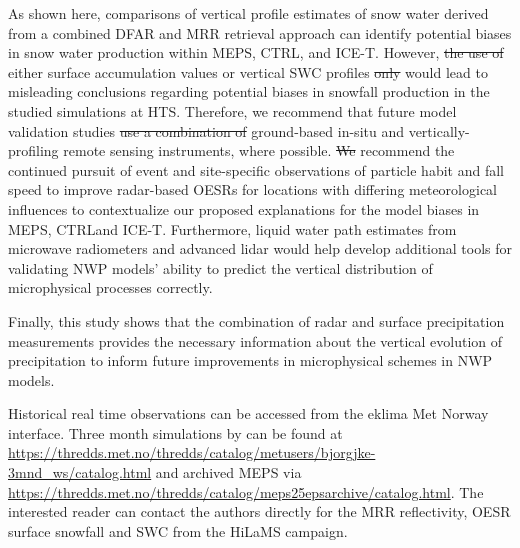 \documentclass{ametsocV5}
\providecommand{\DIFadd}[1]{{\protect\color{blue}\uwave{#1}}} %
\providecommand{\DIFdel}[1]{{\protect\color{red}\sout{#1}}}                      %
\providecommand{\DIFaddbegin}{} %
\providecommand{\DIFaddend}{} %
\providecommand{\DIFdelbegin}{} %
\providecommand{\DIFdelend}{} %
\newcommand{\DIFscaledelfig}{0.5}
\newlength{\DIFdelgraphicswidth} %
\newlength{\DIFdelgraphicsheight} %
\newcommand{\DIFaddincludegraphics}[2][]{{\color{blue}\fbox{\DIFOincludegraphics[#1]{#2}}}} %
\newcommand{\DIFdelincludegraphics}[2][]{%
\sbox{\DIFdelgraphicsbox}{\DIFOincludegraphics[#1]{#2}}%
\settoboxwidth{\DIFdelgraphicswidth}{\DIFdelgraphicsbox} %
\settoboxtotalheight{\DIFdelgraphicsheight}{\DIFdelgraphicsbox} %
\scalebox{\DIFscaledelfig}{%
\parbox[b]{\DIFdelgraphicswidth}{\usebox{\DIFdelgraphicsbox}\\[-\baselineskip] \rule{\DIFdelgraphicswidth}{0em}}\llap{\resizebox{\DIFdelgraphicswidth}{\DIFdelgraphicsheight}{%
\setlength{\unitlength}{\DIFdelgraphicswidth}%
\begin{picture}(1,1)%
\thicklines\linethickness{2pt} %
{\color[rgb]{1,0,0}\put(0,0){\framebox(1,1){}}}%
{\color[rgb]{1,0,0}\put(0,0){\line( 1,1){1}}}%
{\color[rgb]{1,0,0}\put(0,1){\line(1,-1){1}}}%
\end{picture}%
}\hspace*{3pt}}} %
} %
\DeclareRobustCommand{\DIFaddbegin}{\DIFOaddbegin \let\includegraphics\DIFaddincludegraphics} %
\DeclareRobustCommand{\DIFaddend}{\DIFOaddend \let\includegraphics\DIFOincludegraphics} %
\DeclareRobustCommand{\DIFdelbegin}{\DIFOdelbegin \let\includegraphics\DIFdelincludegraphics} %
\DeclareRobustCommand{\DIFdelend}{\DIFOaddend \let\includegraphics\DIFOincludegraphics} %
\begin{document}
	As shown here, comparisons of vertical profile estimates of snow water derived from a combined DFAR and MRR retrieval approach can identify potential biases in snow water production within MEPS, CTRL, and ICE-T. However, \DIFdelbegin \DIFdel{the use of }\DIFdelend \DIFaddbegin \DIFadd{using }\DIFaddend either surface accumulation values or vertical SWC profiles \DIFdelbegin \DIFdel{only }\DIFdelend would lead to misleading conclusions regarding potential biases in snowfall production in the studied simulations at HTS. Therefore, we recommend that future model validation studies \DIFdelbegin \DIFdel{use a combination of }\DIFdelend \DIFaddbegin \DIFadd{combine }\DIFaddend ground-based in-situ and vertically-profiling remote sensing instruments, where possible. \DIFdelbegin \DIFdel{We }\DIFdelend \DIFaddbegin \DIFadd{In addition, we }\DIFaddend recommend the continued pursuit of event and site-specific observations of particle habit and fall speed to improve radar-based OESRs for locations with differing meteorological influences to contextualize our proposed explanations for the model biases in MEPS, CTRL\DIFaddbegin \DIFadd{, }\DIFaddend and ICE-T. Furthermore, liquid water path estimates from microwave radiometers and advanced lidar would help develop additional tools for validating NWP models' ability to predict the vertical distribution of microphysical processes correctly. 

	Finally, this study shows that the combination of radar and surface precipitation measurements provides the necessary information about the vertical evolution of precipitation to inform future improvements in microphysical schemes in NWP models. 



%
\datastatement
Historical real time observations can be accessed from the eklima Met Norway interface.
Three month simulations by \citet{engdahl_effects_2020} can be found at \url{https://thredds.met.no/thredds/catalog/metusers/bjorgjke-3mnd_ws/catalog.html} and archived MEPS via \url{https://thredds.met.no/thredds/catalog/meps25epsarchive/catalog.html}. The interested reader can contact the authors directly for the MRR reflectivity, OESR surface snowfall and SWC from the HiLaMS campaign. 
\end{document}
